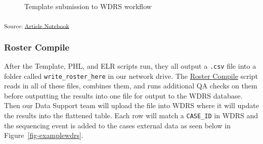 \documentclass[
  letterpaper,
  DIV=11,
  numbers=noendperiod]{scrartcl}
\begin{document}
\begin{figure}[H]


\caption{\label{fig-templateflow}Template submission to WDRS workflow}

\end{figure}%

\textsubscript{Source:
\href{https://NW-PaGe.github.io/sequencing_integration_pipeline1.0/index.qmd.html}{Article
Notebook}}

\subsubsection{Roster Compile}\label{sec-rostercompile}

After the Template, PHL, and ELR scripts run, they all output a
\texttt{.csv} file into a folder called \texttt{write\_roster\_here} in
our network drive. The \href{ROSTER_COMPILE.Rmd}{Roster Compile} script
reads in all of these files, combines them, and runs additional QA
checks on them before outputting the results into one file for output to
the WDRS database. Then our Data Support team will upload the file into
WDRS where it will update the results into the flattened table. Each row
will match a \texttt{CASE\_ID} in WDRS and the sequencing event is added
to the cases external data as seen below in
Figure~\ref{fig-examplewdrs}.
\end{document}
